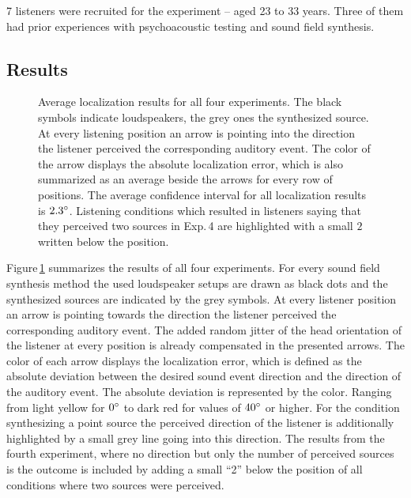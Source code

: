 7 listeners were recruited for the experiment -- aged 23 to 33 years.
Three of them had prior experiences with psychoacoustic testing and sound field
synthesis.




\subsection{Results}
\label{sec:localization_results}
%
\begin{figure}
    \small
    \centering
    
    \caption{Average localization results for all four experiments. The black
    symbols indicate loudspeakers, the grey ones the synthesized source. At
    every listening position an arrow is pointing into the direction the
    listener perceived the corresponding auditory event. The color of the arrow
    displays the absolute localization error, which is also summarized as an
    average beside the arrows for every row of positions. The average confidence interval for
    all localization results is $2.3^\circ$. Listening conditions which
    resulted in listeners saying that they perceived two sources in Exp.\,4 are
    highlighted with a small $2$ written below the position.
    }
    \label{fig:localization_results}
\end{figure}
%
Figure\,\ref{fig:localization_results} summarizes the results of all four
experiments. For every sound field synthesis method the used loudspeaker setups
are drawn as black dots and the synthesized sources are indicated by the grey
symbols. At every listener position an arrow is pointing towards the direction
the listener perceived the corresponding auditory event. The added random jitter
of the head orientation of the listener at every position is already compensated
in the presented arrows. The color of each arrow displays the localization
error, which is defined as the absolute deviation between the desired sound
event direction and the direction of the auditory event. The absolute deviation
is represented by the color. Ranging from light yellow for $0^\circ$ to dark red
for values of $40^\circ$ or higher.
For the
condition synthesizing a point source the perceived direction of the listener is
additionally highlighted by a small grey line going into this direction.
The results from the fourth experiment, where no direction but only the number
of perceived sources is the outcome is included by adding a small ``2'' below the
position of all conditions where two sources were perceived.

